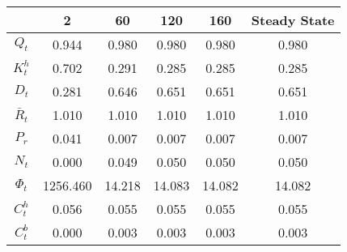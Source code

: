 \centering                                                
\begin{tabular}{|c|c|c|c|c|c|}                            
\hline                                                    
 & 2 & 60 & 120 & 160 & Steady State \\                   
\hline                                                    
$Q_t$ & 0.944 & 0.980 & 0.980 & 0.980 & 0.980 \\          
\hline                                                    
$K^h_t$ & 0.702 & 0.291 & 0.285 & 0.285 & 0.285 \\        
\hline                                                    
$D_t$ & 0.281 & 0.646 & 0.651 & 0.651 & 0.651 \\          
\hline                                                    
$\bar{R}_t$ & 1.010 & 1.010 & 1.010 & 1.010 & 1.010 \\    
\hline                                                    
$P_r$ & 0.041 & 0.007 & 0.007 & 0.007 & 0.007 \\          
\hline                                                    
$N_t$ & 0.000 & 0.049 & 0.050 & 0.050 & 0.050 \\          
\hline                                                    
$\Phi_t$ & 1256.460 & 14.218 & 14.083 & 14.082 & 14.082 \\
\hline                                                    
$C^h_t$ & 0.056 & 0.055 & 0.055 & 0.055 & 0.055 \\        
\hline                                                    
$C^b_t$ & 0.000 & 0.003 & 0.003 & 0.003 & 0.003 \\        
\hline                                                    
\end{tabular}                                             
